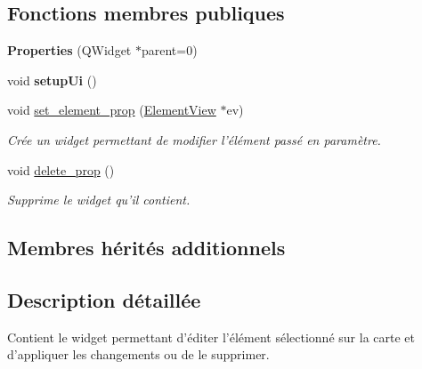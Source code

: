 \subsection*{Fonctions membres publiques}
\begin{DoxyCompactItemize}
\item 
\hypertarget{classProperties_a3b15688d359ed96e2632d2b642488a0e}{{\bfseries Properties} (Q\+Widget $\ast$parent=0)}\label{classProperties_a3b15688d359ed96e2632d2b642488a0e}

\item 
\hypertarget{classProperties_a357903294eec6fb6a410c3d54b228f74}{void {\bfseries setup\+Ui} ()}\label{classProperties_a357903294eec6fb6a410c3d54b228f74}

\item 
void \hyperlink{classProperties_a035f6ed307968ff3e06e53342c0b3843}{set\+\_\+element\+\_\+prop} (\hyperlink{classElementView}{Element\+View} $\ast$ev)
\begin{DoxyCompactList}\small\item\em Crée un widget permettant de modifier l’élément passé en paramètre. \end{DoxyCompactList}\item 
\hypertarget{classProperties_affc1d43c4a1894c71f7970b9fb58a9db}{void \hyperlink{classProperties_affc1d43c4a1894c71f7970b9fb58a9db}{delete\+\_\+prop} ()}\label{classProperties_affc1d43c4a1894c71f7970b9fb58a9db}

\begin{DoxyCompactList}\small\item\em Supprime le widget qu’il contient. \end{DoxyCompactList}\end{DoxyCompactItemize}
\subsection*{Membres hérités additionnels}


\subsection{Description détaillée}
Contient le widget permettant d’éditer l’élément sélectionné sur la carte et d’appliquer les changements ou de le supprimer. 

